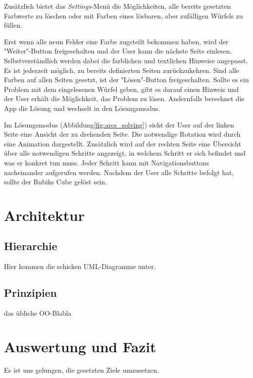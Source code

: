 Zusätzlich bietet das \emph{Settings}-Menü die Möglichkeiten, alle bereits
gesetzten Farbwerte zu löschen oder mit Farben eines lösbaren, aber zufälligen
Würfels zu füllen.

Erst wenn alle neun Felder eine Farbe zugeteilt bekommen haben, wird der
"Weiter"-Button freigeschalten und der User kann die nächste Seite einlesen.
Selbstverständlich werden dabei die farblichen und textlichen Hinweise
angepasst. Es ist jederzeit möglich, zu bereits definierten Seiten
zurückzukehren. Sind alle Farben auf allen Seiten gesetzt, ist der
"Lösen"-Button freigeschalten. Sollte es ein Problem mit dem eingelesenen Würfel
geben, gibt es darauf einen Hinweis und der User erhält die Möglichkeit, das
Problem zu lösen. Andernfalls berechnet die App die Lösung und wechselt in den
Lösungsmodus.

Im Lösungsmodus (Abbildung\ref{fig:arcs_solving}) sieht der User auf der linken
Seite eine Ansicht der zu drehenden Seite. Die notwendige Rotation wird durch
eine Animation dargestellt. Zusätzlich wird auf der rechten Seite eine Übersicht
über alle notwendigen Schritte angezeigt, in welchem Schritt er sich befindet
und was er konkret tun muss. Jeder Schritt kann mit Navigationsbuttons
nacheinander aufgerufen werden. Nachdem der User alle Schritte befolgt hat,
sollte der Rubiks Cube gelöst sein.

\section{Architektur}  %

\subsection{Hierarchie}  %
Hier kommen die schicken UML-Diagramme unter.

\subsection{Prinzipien}  %
das übliche OO-Blabla

\section{Auswertung und Fazit}  %

Es ist uns gelungen, die gesetzten Ziele umzusetzen.




\appendix
\printbibliography[heading=bibintoc,title={Quellenverzeichnis}]
\listoffigures


